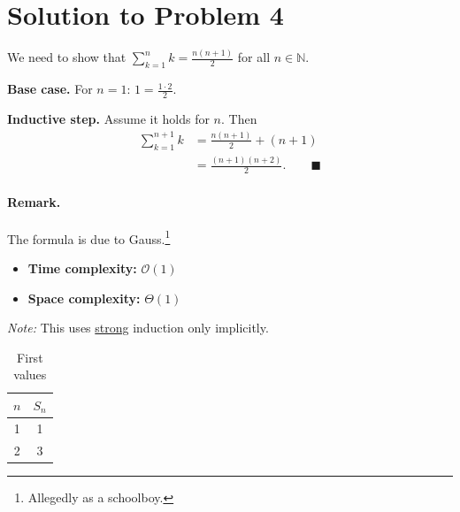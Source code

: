 \section*{Solution to Problem 4}

We need to show that $\sum_{k=1}^{n} k = \frac{n(n+1)}{2}$ for all $n \in \mathbb{N}$.

\textbf{Base case.} For $n = 1$: $1 = \frac{1 \cdot 2}{2}$. \checkmark

\textbf{Inductive step.} Assume it holds for $n$. Then
\begin{align*}
\sum_{k=1}^{n+1} k &= \frac{n(n+1)}{2} + (n+1) \\
&= \frac{(n+1)(n+2)}{2}. \qquad \blacksquare
\end{align*}

\begin{center}
\end{center}

\paragraph{Remark.} The formula is due to Gauss.\footnote{Allegedly as a schoolboy.}

\begin{itemize}
    \item \textbf{Time complexity:} $\mathcal{O}(1)$
    \item \textbf{Space complexity:} $\Theta(1)$
\end{itemize}

\hrulefill

\noindent\textit{Note:} \small{This uses \underline{strong} induction only implicitly.}\normalsize

\begin{table}[h!]
\centering
\begin{tabular}{|c|c|}
\hline
$n$ & $S_n$ \\ \hline
1 & 1 \\ \hline
2 & 3 \\ \hline
\end{tabular}
\caption{First values}
\end{table}
